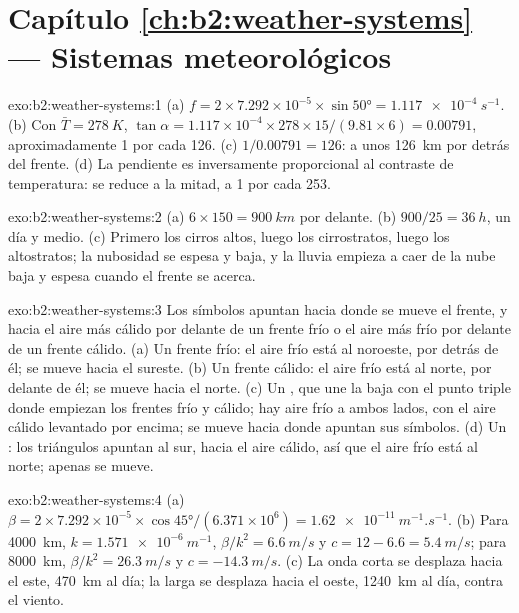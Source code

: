 \section*{Capítulo \ref{ch:b2:weather-systems} --- Sistemas meteorológicos}

\begin{solution}{exo:b2:weather-systems:1}
(a) $f = 2 \times 7.292 \times 10^{-5} \times \sin\ang{50} = \qty{1.117e-4}{s^{-1}}$. (b) Con
$\bar T = \qty{278}{K}$, $\tan\alpha = 1.117 \times 10^{-4} \times 278 \times 15/(9.81 \times 6)
= 0.00791$, aproximadamente 1 por cada 126. (c) $1/0.00791 = 126$: a unos \qty{126}{km} por detrás del frente. (d) La
pendiente es inversamente proporcional al contraste de temperatura: se reduce a la mitad, a 1 por cada 253.
\end{solution}

\begin{solution}{exo:b2:weather-systems:2}
(a) $6 \times 150 = \qty{900}{km}$ por delante. (b) $900/25 = \qty{36}{h}$, un día y medio. (c) Primero
los cirros altos, luego los cirrostratos, luego los altostratos; la nubosidad se espesa y baja, y la lluvia
empieza a caer de la nube baja y espesa cuando el frente se acerca.
\end{solution}

\begin{solution}{exo:b2:weather-systems:3}
Los símbolos apuntan hacia donde se mueve el frente, y hacia el aire más cálido por delante de un frente frío o el
aire más frío por delante de un frente cálido. (a) Un frente frío: el aire frío está al noroeste, por detrás de
él; se mueve hacia el sureste. (b) Un frente cálido: el aire frío está al norte, por delante de él; se mueve hacia el
norte. (c) Un , que une la baja con el punto triple donde empiezan los frentes frío y
cálido; hay aire frío a ambos lados, con el aire cálido levantado por encima; se mueve hacia donde apuntan sus
símbolos. (d) Un : los triángulos apuntan al sur, hacia el aire cálido, así que el aire frío
está al norte; apenas se mueve.
\end{solution}

\begin{solution}{exo:b2:weather-systems:4}
(a) $\beta = 2 \times 7.292 \times 10^{-5} \times \cos\ang{45}/(6.371 \times 10^6) =
\qty{1.62e-11}{m^{-1}.s^{-1}}$. (b) Para \qty{4000}{km}, $k = \qty{1.571e-6}{m^{-1}}$, $\beta/k^2 =
\qty{6.6}{m/s}$ y $c = 12 - 6.6 = \qty{5.4}{m/s}$; para \qty{8000}{km}, $\beta/k^2 =
\qty{26.3}{m/s}$ y $c = \qty{-14.3}{m/s}$. (c) La onda corta se desplaza hacia el este, \qty{470}{km} al día;
la larga se desplaza hacia el oeste, \qty{1240}{km} al día, contra el viento.
\end{solution}

